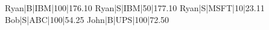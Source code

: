 Ryan|B|IBM|100|176.10
Ryan|S|IBM|50|177.10
Ryan|S|MSFT|10|23.11
Bob|S|ABC|100|54.25
John|B|UPS|100|72.50